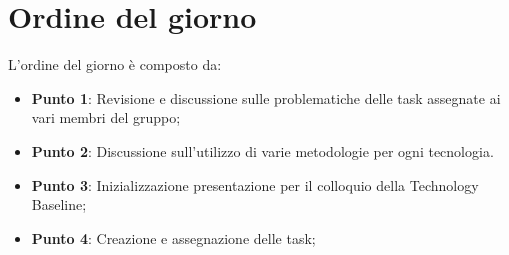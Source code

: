 \section{Ordine del giorno}
L'ordine del giorno è composto da: 
\begin{itemize}
	\item \textbf{Punto 1}: Revisione e discussione sulle problematiche delle task assegnate ai vari membri del gruppo; 
	\item \textbf{Punto 2}: Discussione sull'utilizzo di varie metodologie per ogni tecnologia.  
	\item \textbf{Punto 3}: Inizializzazione presentazione per il colloquio della Technology Baseline; 
	\item \textbf{Punto 4}: Creazione e assegnazione delle task; 
\end{itemize}